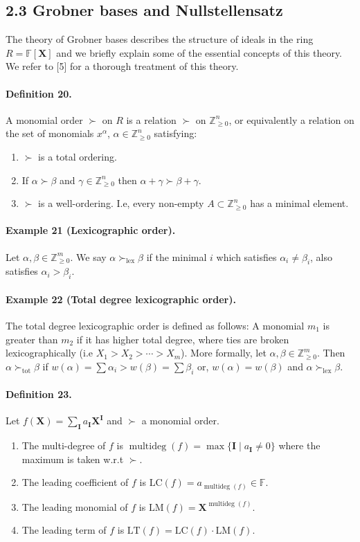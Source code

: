 \subsection*{2.3 Grobner bases and Nullstellensatz}
The theory of Grobner bases describes the structure of ideals in the ring $R=\mathbb F[\boldsymbol X]$ and we briefly explain some of the essential concepts of this theory. We refer to [5] for a thorough treatment of this theory.
\paragraph{Definition 20.} A monomial order $\succ$ on $R$ is a relation $\succ$ on $\mathbb Z_{\geq0}^n$, or equivalently a relation on the set of monomials $x^\alpha$, $\alpha\in\mathbb Z_{\geq0}^n$ satisfying:
\begin{enumerate}
\item $\succ$ is a total ordering.
\item If $\alpha\succ\beta$ and $\gamma\in\mathbb Z_{\geq0}^n$ then $\alpha+\gamma\succ\beta+\gamma$.
\item $\succ$ is a well-ordering. I.e, every non-empty $A\subset\mathbb Z_{\geq0}^n$ has a minimal element.
\end{enumerate}
\paragraph{Example 21 (Lexicographic order).} Let $\alpha,\beta\in\mathbb Z_{\geq0}^m$. We say $\alpha\succ_{\mathrm{lex}}\beta$ if the minimal $i$ which satisfies $\alpha_i\neq\beta_i$, also satisfies $\alpha_i>\beta_i$.
\paragraph{Example 22 (Total degree lexicographic order).} The total degree lexicographic order is defined as follows: A monomial $m_1$ is greater than $m_2$ if it has higher total degree, where ties are broken lexicographically (i.e $X_1>X_2>\cdots>X_m$). More formally, let $\alpha,\beta\in\mathbb Z_{\geq0}^m$. Then $\alpha\succ_{\mathrm{tot}}\beta$ if $w(\alpha)=\sum\alpha_i>w(\beta)=\sum\beta_i$ or, $w(\alpha)=w(\beta)$ and $\alpha\succ_{\mathrm{lex}}\beta$.
\paragraph{Definition 23.} Let $f(\boldsymbol X)=\sum_{\boldsymbol I}a_{\boldsymbol I}\boldsymbol X^{\boldsymbol I}$ and $\succ$ a monomial order.
\begin{enumerate}
\item The multi-degree of $f$ is $\operatorname{multideg}(f)=\max\{\boldsymbol I\mid a_{\boldsymbol I}\neq0\}$ where the maximum is taken w.r.t $\succ$.
\item The leading coefficient of $f$ is $\mathrm{LC}(f)=a_{\operatorname{multideg}(f)}\in\mathbb F$.
\item The leading monomial of $f$ is $\mathrm{LM}(f)=\boldsymbol X^{\operatorname{multideg}(f)}$.
\item The leading term of $f$ is $\mathrm{LT}(f)=\mathrm{LC}(f)\cdot\mathrm{LM}(f)$.
\end{enumerate}
